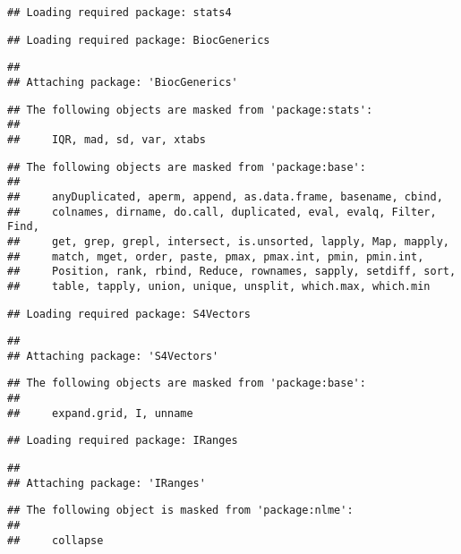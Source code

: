 \documentclass[
]{article}
\begin{document}
\begin{verbatim}
## Loading required package: stats4
\end{verbatim}

\begin{verbatim}
## Loading required package: BiocGenerics
\end{verbatim}

\begin{verbatim}
## 
## Attaching package: 'BiocGenerics'
\end{verbatim}

\begin{verbatim}
## The following objects are masked from 'package:stats':
## 
##     IQR, mad, sd, var, xtabs
\end{verbatim}

\begin{verbatim}
## The following objects are masked from 'package:base':
## 
##     anyDuplicated, aperm, append, as.data.frame, basename, cbind,
##     colnames, dirname, do.call, duplicated, eval, evalq, Filter, Find,
##     get, grep, grepl, intersect, is.unsorted, lapply, Map, mapply,
##     match, mget, order, paste, pmax, pmax.int, pmin, pmin.int,
##     Position, rank, rbind, Reduce, rownames, sapply, setdiff, sort,
##     table, tapply, union, unique, unsplit, which.max, which.min
\end{verbatim}

\begin{verbatim}
## Loading required package: S4Vectors
\end{verbatim}

\begin{verbatim}
## 
## Attaching package: 'S4Vectors'
\end{verbatim}

\begin{verbatim}
## The following objects are masked from 'package:base':
## 
##     expand.grid, I, unname
\end{verbatim}

\begin{verbatim}
## Loading required package: IRanges
\end{verbatim}

\begin{verbatim}
## 
## Attaching package: 'IRanges'
\end{verbatim}

\begin{verbatim}
## The following object is masked from 'package:nlme':
## 
##     collapse
\end{verbatim}
\end{document}
